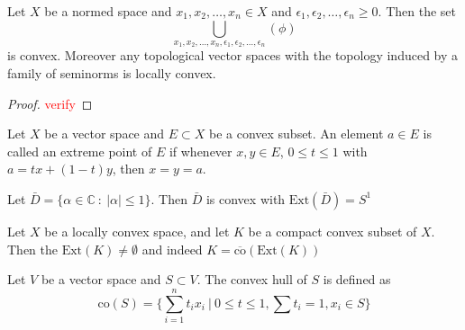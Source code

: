 \begin{lemma}
  Let $X$ be a normed space and $x_1 , x_2 , \ldots , x_n \in X$ and
  $\epsilon_1 , \epsilon_2 , \ldots , \epsilon_n \ge 0$. Then the set \[
    \bigcup_{x_1 , x_2 , \ldots , x_n, \epsilon_1 , \epsilon_2 ,
    \ldots , \epsilon_n}(\phi)
  \]
  is convex.
  Moreover any topological vector spaces with the topology induced by
  a family of seminorms is locally convex.
\end{lemma}
\begin{proof}
  \textcolor{red}{verify}
\end{proof}

\begin{definition}
  Let $X$ be a vector space and $E \subset X$ be a convex subset. An
  element $a \in E$ is called an extreme point of $E$ if whenever $x,
  y \in E$, $0 \le t \le 1$ with $a  = tx + (1-t) y$, then $x = y = a$.
\end{definition}
\begin{example}
  Let $\bar{D} = \{ \alpha \in \mathbb{C} \ : \ |\alpha| \le 1 \}$.
  Then $\bar{D}$ is convex with $\textrm{Ext}(\bar{D}) = S^1$
\end{example}

\begin{theorem}
  Let $X$ be a locally convex space, and let $K$ be a compact convex
  subset of $X$. Then the $ \textrm{Ext}(K) \neq \emptyset$ and
  indeed $K = \overline{\textrm{co}}(\textrm{Ext}(K))$
\end{theorem}

\begin{definition}
  Let $V$ be a vector space and $S\subset V$. The convex hull of $S$
  is defined as \[
    \textrm{co}(S) = \Big \{ \sum_{i = 1}^{n} t_i x_i \ \Big| \ 0 \le
    t \le 1, \sum t_i = 1, x_i \in S \Big\}
  \]
\end{definition}

